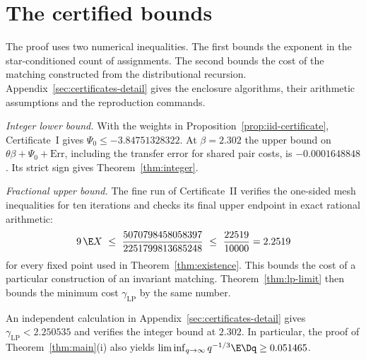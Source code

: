 \section{The certified bounds}\label{sec:certificates}

The proof uses two numerical inequalities. The first bounds the exponent in the
star-conditioned count of assignments. The second bounds the cost of the matching
constructed from the distributional recursion. Appendix~\ref{sec:certificates-detail}
gives the enclosure algorithms, their arithmetic assumptions and the reproduction
commands.

\emph{Integer lower bound.}
With the weights in Proposition~\ref{prop:iid-certificate}, Certificate~I gives
$\Psi_0\le-3.84751328322$. At $\beta=2.302$ the upper bound on
$\theta\beta+\Psi_0+\mathrm{Err}$, including the transfer error for shared pair
costs, is $-0.0001648848$. Its strict sign gives Theorem~\ref{thm:integer}.

\emph{Fractional upper bound.}
The fine run of Certificate~II verifies the one-sided mesh inequalities for ten
iterations and checks its final upper endpoint in exact rational arithmetic:
\[
 9\,\E X\ \le\ \frac{5070798458058397}{2251799813685248}
 \ \le\ \frac{22519}{10000}=2.2519
\]
for every fixed point used in Theorem~\ref{thm:existence}. This bounds the cost
of a particular construction of an invariant matching. Theorem~\ref{thm:lp-limit}
then bounds the minimum cost $\gamma_{\mathrm{LP}}$ by the same number.

An independent calculation in Appendix~\ref{sec:certificates-detail} gives
$\gamma_{\mathrm{LP}}<2.250535$ and verifies the integer bound at $2.302$.
In particular, the proof of Theorem~\ref{thm:main}(i) also yields
$\liminf_{q\to\infty}q^{-1/3}\E\Dq\ge0.051465$.
